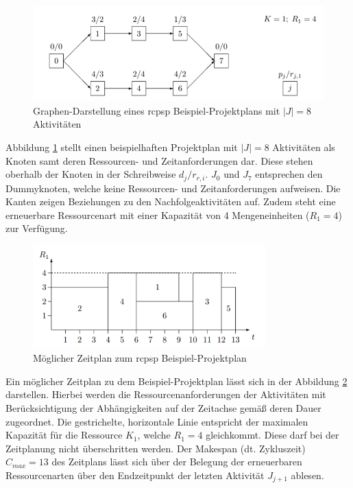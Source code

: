 \begin{figure}[H]
    \centering
    \includegraphics[width=1\textwidth]{assets/img/02_Grundlagen/ExampleProjectRCPSP_Plan.png}
    \caption{Graphen-Darstellung eines \ac{rcpsp} Beispiel-Projektplans mit $|J| = 8$ Aktivitäten} 
    \label{img:example_rcpsp}
\end{figure}

Abbildung \ref{img:example_rcpsp} stellt einen beispielhaften Projektplan mit $|J| = 8$ Aktivitäten als Knoten samt deren Ressourcen- und Zeitanforderungen dar. Diese stehen oberhalb der Knoten in der Schreibweise $d_j / r_{r,i}$. $J_0$ und $J_7$ entsprechen den Dummyknoten, welche keine Ressourcen- und Zeitanforderungen aufweisen. Die Kanten zeigen Beziehungen zu den Nachfolgeaktivitäten auf. Zudem steht eine erneuerbare Ressourcenart mit einer Kapazität von 4 Mengeneinheiten ($R_1 = 4$) zur Verfügung. 

\begin{figure}[H]
    \centering
    \includegraphics[width=0.8\textwidth]{assets/img/02_Grundlagen/ExampleProjectRCPSP_Schedule.png}
    \caption{Möglicher Zeitplan zum \ac{rcpsp} Beispiel-Projektplan} 
    \label{img:example_rcpsp_schedule}
\end{figure}
Ein möglicher Zeitplan zu dem Beispiel-Projektplan lässt sich in der Abbildung \ref{img:example_rcpsp_schedule} darstellen. Hierbei werden die Ressourcenanforderungen der Aktivitäten mit Berücksichtigung der Abhängigkeiten auf der Zeitachse gemäß deren Dauer zugeordnet. Die gestrichelte, horizontale Linie entspricht der maximalen Kapazität für die Ressource $K_1$, welche $R_1 = 4$ gleichkommt. Diese darf bei der Zeitplanung nicht überschritten werden. Der Makespan (dt. Zykluszeit) $C_{max} = 13$ des Zeitplans lässt sich über der Belegung der erneuerbaren Ressourcenarten über den Endzeitpunkt der letzten Aktivität $J_{j+1}$ ablesen. \\

